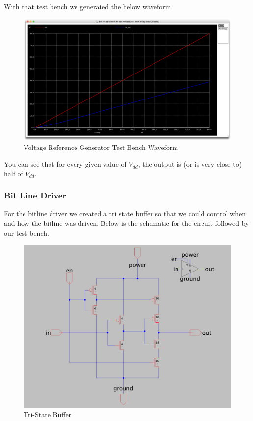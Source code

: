\documentclass[a4paper]{article}
\begin{document}
With that test bench we generated the below waveform.\\

\begin{figure}[H]
	\centering
	\includegraphics[scale=0.1]{vRefTestWave}
	\caption{Voltage Reference Generator Test Bench Waveform}
	\label{fig:vRefTestWave}
\end{figure}

You can see that for every given value of $V_{dd}$, the output is (or is very close to) half of $V_{dd}$.

\subsubsection{Bit Line Driver}

For the bitline driver we created a tri state buffer so that we could control when and how the bitline was driven. Below is the schematic for the circuit followed by our test bench.

\begin{figure}[H]
	\centering
	\includegraphics[scale=0.15]{tristate}
	\caption{Tri-State Buffer}
	\label{fig:tristate}
\end{figure}
\end{document}
